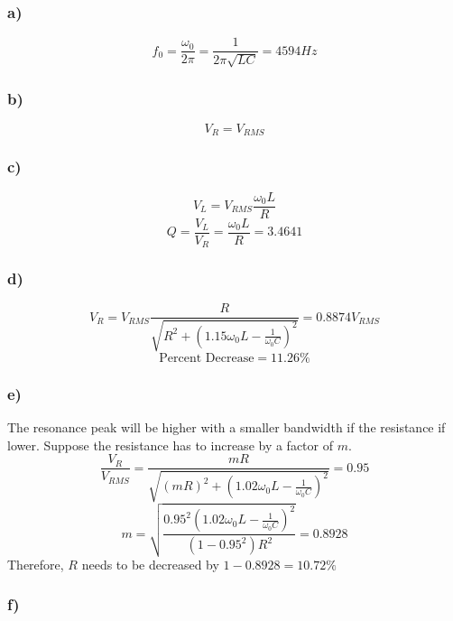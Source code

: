 \documentclass[../homework.tex]{subfiles}
\begin{document}
\subsubsection*{a)}
\begin{equation*}
    f_0 = \frac{\omega_0}{2 \pi} = \frac{1}{2 \pi \sqrt{LC}} = 4594Hz
\end{equation*}
\subsubsection*{b)}
\begin{equation*}
    V_{R} = V_{RMS}
\end{equation*}
\subsubsection*{c)}
\begin{equation*}
    V_L = V_{RMS} \frac{\omega_0 L}{ R}
\end{equation*}
\begin{equation*}
    Q = \frac{V_L}{V_R} = \frac{\omega_0 L}{R} = 3.4641
\end{equation*}
\subsubsection*{d)}
\begin{equation*}
    V_R = V_{RMS} \frac{R}{\sqrt{R^2 + (1.15 \omega_0 L - \frac{1}{\omega_0 C})^2}} = 0.8874 V_{RMS}
\end{equation*}
\begin{equation*}
    \text{Percent Decrease} = 11.26\%  
\end{equation*}
\subsubsection*{e)}
The resonance peak will be higher with a smaller bandwidth if the resistance if lower. Suppose the resistance has to increase by a factor of $m$.
\begin{equation*}
    \frac{V_R}{V_{RMS}} = \frac{mR}{\sqrt{(mR)^2 + (1.02 \omega_0 L - \frac{1}{\omega_0 C})^2}} = 0.95
\end{equation*}
\begin{equation*}
    m = \sqrt{\frac{0.95^2 (1.02\omega_0 L - \frac{1}{\omega_0 C})^2}{(1-0.95^2) R^2}} = 0.8928
\end{equation*}
Therefore, $R$ needs to be decreased by $1 - 0.8928 = 10.72\%$
\subsubsection*{f)}
\end{document}
